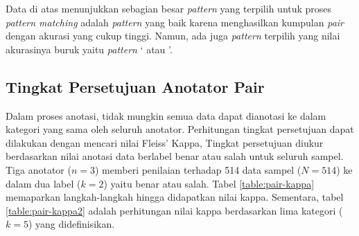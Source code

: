 \begin{table}
  \centering
  \caption{Akurasi \textit{pair} berdasarkan \textit{pattern}}
  \label{table:akurasi-pair-patt}
\end{table}

Data di atas menunjukkan sebagian besar \textit{pattern} yang terpilih untuk proses \textit{pattern matching} adalah \textit{pattern} yang baik karena menghasilkan kumpulan \textit{pair} dengan akurasi yang cukup tinggi. Namun, ada juga \textit{pattern} terpilih yang nilai akurasinya buruk yaitu \textit{pattern} `{\tagHypernym} atau {\tagHyponym}'.

\subsection{Tingkat Persetujuan Anotator Pair}
Dalam proses anotasi, tidak mungkin semua data dapat dianotasi ke dalam kategori yang sama oleh seluruh anotator. Perhitungan tingkat persetujuan dapat dilakukan dengan mencari nilai Fleiss' Kappa, Tingkat persetujuan diukur berdasarkan nilai anotasi data berlabel benar atau salah untuk seluruh sampel. Tiga anotator ($n=3$) memberi penilaian terhadap 514 data sampel ($N=514$) ke dalam dua label ($k=2$) yaitu benar atau salah. Tabel \ref{table:pair-kappa} memaparkan langkah-langkah hingga didapatkan nilai kappa. Sementara, tabel \ref{table:pair-kappa2} adalah perhitungan nilai kappa berdasarkan lima kategori ($k=5$) yang didefinisikan.

